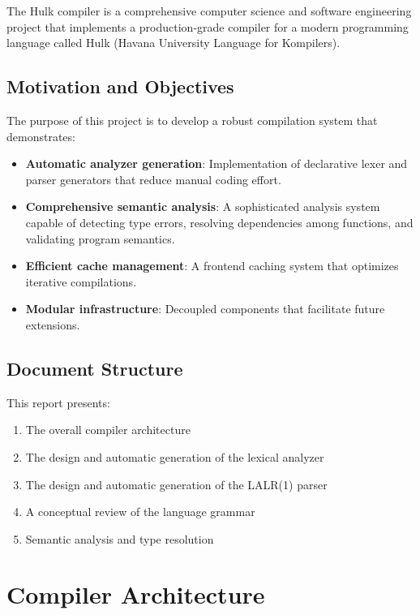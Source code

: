 \documentclass[12pt,a4paper]{report}
\begin{document}
The Hulk compiler is a comprehensive computer science and software engineering project that implements a production-grade compiler for a modern programming language called Hulk (Havana University Language for Kompilers).

\section{Motivation and Objectives}

The purpose of this project is to develop a robust compilation system that demonstrates:

\begin{itemize}
    \item \textbf{Automatic analyzer generation}: Implementation of declarative lexer and parser generators that reduce manual coding effort.
    \item \textbf{Comprehensive semantic analysis}: A sophisticated analysis system capable of detecting type errors, resolving dependencies among functions, and validating program semantics.
    \item \textbf{Efficient cache management}: A frontend caching system that optimizes iterative compilations.
    \item \textbf{Modular infrastructure}: Decoupled components that facilitate future extensions.
\end{itemize}

\section{Document Structure}

This report presents:
\begin{enumerate}
    \item The overall compiler architecture
    \item The design and automatic generation of the lexical analyzer
    \item The design and automatic generation of the LALR(1) parser
    \item A conceptual review of the language grammar
    \item Semantic analysis and type resolution
\end{enumerate}

\chapter{Compiler Architecture}
\end{document}
